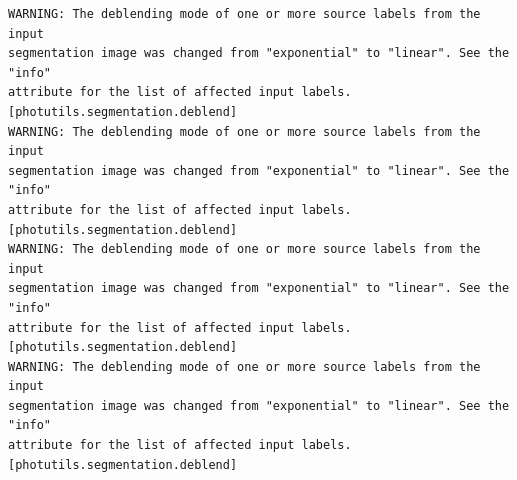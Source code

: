 \documentclass[11pt]{article}
\begin{document}
    \begin{Verbatim}[commandchars=\\\{\}]
WARNING: The deblending mode of one or more source labels from the input
segmentation image was changed from "exponential" to "linear". See the "info"
attribute for the list of affected input labels.
[photutils.segmentation.deblend]
WARNING: The deblending mode of one or more source labels from the input
segmentation image was changed from "exponential" to "linear". See the "info"
attribute for the list of affected input labels.
[photutils.segmentation.deblend]
WARNING: The deblending mode of one or more source labels from the input
segmentation image was changed from "exponential" to "linear". See the "info"
attribute for the list of affected input labels.
[photutils.segmentation.deblend]
WARNING: The deblending mode of one or more source labels from the input
segmentation image was changed from "exponential" to "linear". See the "info"
attribute for the list of affected input labels.
[photutils.segmentation.deblend]
    \end{Verbatim}
\end{document}
